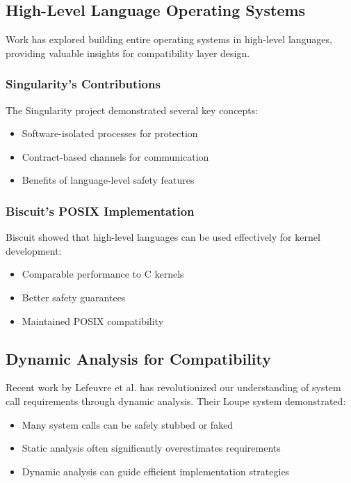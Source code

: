 \documentclass[conference]{IEEEtran}
\begin{document}
\subsection{High-Level Language Operating Systems}
Work has explored building entire operating systems in high-level languages, providing valuable insights for compatibility layer design.

\subsubsection{Singularity's Contributions}
The Singularity project \cite{singularity} demonstrated several key concepts:
\begin{itemize}
	\item Software-isolated processes for protection
	\item Contract-based channels for communication
	\item Benefits of language-level safety features
\end{itemize}

\subsubsection{Biscuit's POSIX Implementation}
Biscuit \cite{go_kernel} showed that high-level languages can be used effectively for kernel development:
\begin{itemize}
	\item Comparable performance to C kernels
	\item Better safety guarantees
	\item Maintained POSIX compatibility
\end{itemize}

\subsection{Dynamic Analysis for Compatibility}
Recent work by Lefeuvre et al. \cite{lefeuvre2024loupe} has revolutionized our understanding of system call requirements through dynamic analysis. Their Loupe system demonstrated:
\begin{itemize}
	\item Many system calls can be safely stubbed or faked
	\item Static analysis often significantly overestimates requirements
	\item Dynamic analysis can guide efficient implementation strategies
\end{itemize}
\end{document}
